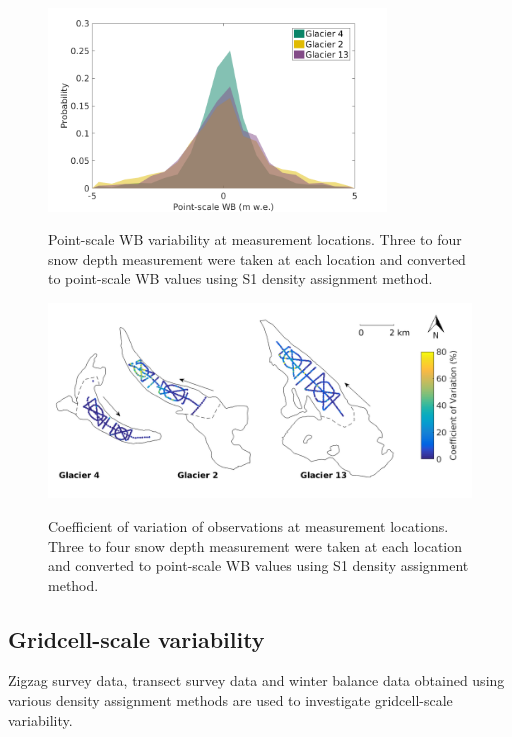 \documentclass{sfuthesis}
\begin{document}
\begin{figure}[H]
	\centering
	\includegraphics[width =0.8\textwidth]{SWEvarOneLocHIST.png}\\
	\caption{Point-scale WB variability at measurement locations. Three to four snow depth measurement were taken at each location and converted to point-scale WB values using S1 density assignment method.}
	\label{fig:SWEvar_oneloc_hist}
\end{figure}

\begin{figure}[H]
	\centering
	\includegraphics[width =\textwidth]{Map_pointstd.png}\\
	\caption{Coefficient of variation of observations at measurement locations. Three to four snow depth measurement were taken at each location and converted to point-scale WB values using S1 density assignment method.}
	\label{fig:SWEvar_oneloc_map}
\end{figure}

\subsection{Gridcell-scale variability}

Zigzag survey data, transect survey data and winter balance data obtained using various density assignment methods are used to investigate gridcell-scale variability. 
\end{document}
